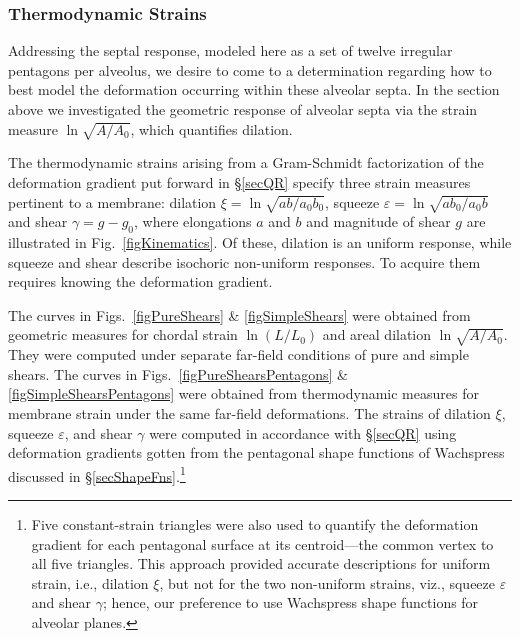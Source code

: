 \subsubsection{Thermodynamic Strains}

Addressing the septal response, modeled here as a set of twelve irregular pentagons per alveolus, we desire to come to a determination regarding how to best model the deformation occurring within these alveolar septa.  In the section above we investigated the geometric response of alveolar septa via the strain measure $\ln \sqrt{A/A_0}$, which quantifies dilation.  

The thermo\-dynamic strains arising from a Gram-Schmidt factorization of the deformation gradient put forward in \S\ref{secQR} specify three strain measures pertinent to a membrane: dilation $\xi = \ln \sqrt{ab/a_0 b_0}$, squeeze $\varepsilon = \ln \sqrt{ab_0 / a_0 b}$ and shear $\gamma = g - g_0$, where elongations $a$ and $b$ and magnitude of shear $g$ are illustrated in Fig.~\ref{figKinematics}.  Of these, dilation is an uniform response, while squeeze and shear describe isochoric non-uniform responses.  To acquire them requires knowing the deformation gradient.

The curves in Figs.~\ref{figPureShears} \& \ref{figSimpleShears} were obtained from geometric measures for chordal strain $\ln (L/L_0)$ and areal dilation $\ln \sqrt{A/A_0}$.  They were computed under separate far-field conditions of pure and simple shears.  The curves in Figs.~\ref{figPureShearsPentagons} \& \ref{figSimpleShearsPentagons} were obtained from thermo\-dynamic measures for membrane strain under the same far-field deformations.  The strains of dilation $\xi$, squeeze $\varepsilon$, and shear $\gamma$ were computed in accordance with \S\ref{secQR} using deformation gradients gotten from the pentagonal shape functions of Wachspress \cite{Wachspress75} discussed in \S\ref{secShapeFns}.\footnote{
	Five constant-strain triangles were also used to quantify the deformation gradient for each pentagonal surface at its centroid---the common vertex to all five triangles.  This approach provided accurate descriptions for uniform strain, i.e., dilation $\xi$, but not for the two non-uniform strains, viz., squeeze $\varepsilon$ and shear $\gamma$; hence, our preference to use Wachspress shape functions for alveolar planes.
} 

